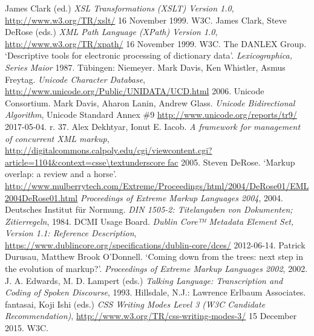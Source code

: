 \begin{bibitemlist}{1}
\label{XSLT}James Clark (ed.) \textit{XSL Transformations (XSLT) Version 1.0},  \url{http://www.w3.org/TR/xslt/} 16 November 1999. W3C. 
\label{XPATH}James Clark, Steve DeRose (eds.) \textit{XML Path Language (XPath) Version 1.0},  \url{http://www.w3.org/TR/xpath/} 16 November 1999. W3C. 
\label{DI-BIBL-7}The DANLEX Group. ‘Descriptive tools for electronic processing of dictionary data’. \textit{Lexicographica, Series Maior} 1987. Tübingen: Niemeyer. 
\label{WD-bibl-01}Mark Davis, Ken Whistler, Asmus Freytag. \textit{Unicode Character Database},  \url{http://www.unicode.org/Public/UNIDATA/UCD.html} 2006. Unicode Consortium. 
\label{WDBIDI}Mark Davis, Aharon Lanin, Andrew Glass. \textit{Unicode Bidirectional Algorithm}, Unicode Standard Annex \#9  \url{http://www.unicode.org/reports/tr9/} 2017-05-04. r. 37. 
\label{NH-BIBL-3}Alex Dekhtyar, Ionut E. Iacob. \textit{A framework for management of concurrent XML markup},  \url{http://digitalcommons.calpoly.edu/cgi/viewcontent.cgi?article=1104\&context=csse\textunderscore fac} 2005. 
\label{NH-BIBL-1}Steven DeRose. ‘Markup overlap: a review and a horse’.  \url{http://www.mulberrytech.com/Extreme/Proceedings/html/2004/DeRose01/EML2004DeRose01.html} \textit{Proceedings of Extreme Markup Languages 2004}, 2004. 
\label{DIN-1505-2}Deutsches Institut für Normung. \textit{DIN 1505-2: Titelangaben von Dokumenten; Zitierregeln}, 1984. 
\label{CO-BIBL-2}DCMI Usage Board. \textit{Dublin Core™ Metadata Element Set, Version 1.1: Reference Description},  \url{https://www.dublincore.org/specifications/dublin-core/dces/} 2012-06-14. 
\label{NH-BIBL-6}Patrick Durusau, Matthew Brook O'Donnell. ‘Coming down from the trees: next step in the evolution of markup?’. \textit{Proceedings of Extreme Markup Languages 2002}, 2002. 
\label{TS-BIBL-1}J. A. Edwards, M. D. Lampert (eds.) \textit{Talking Language: Transcription and Coding of Spoken Discourse}, 1993. Hillsdale, N.J.: Lawrence Erlbaum Associates. 
\label{CSSWM}fantasai, Koji Ishi (eds.) \textit{CSS Writing Modes Level 3 (W3C Candidate Recommendation)},  \url{http://www.w3.org/TR/css-writing-modes-3/} 15 December 2015. W3C. 

\end{bibitemlist}
